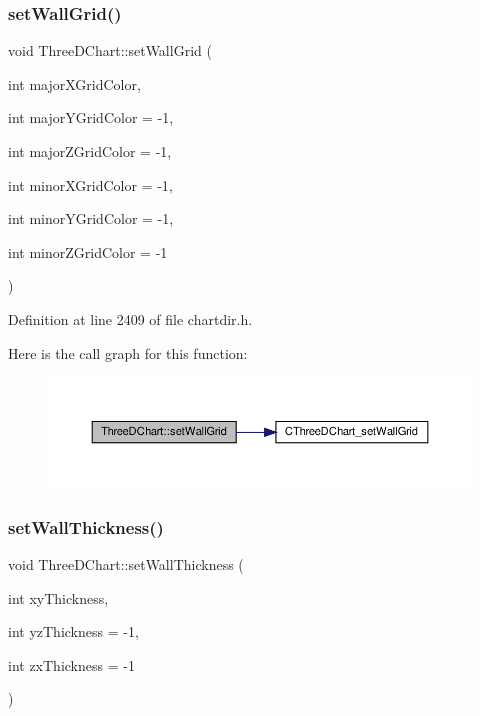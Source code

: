 \subsubsection{\texorpdfstring{set\+Wall\+Grid()}{setWallGrid()}}
{\footnotesize\ttfamily void Three\+D\+Chart\+::set\+Wall\+Grid (\begin{DoxyParamCaption}\item[{int}]{major\+X\+Grid\+Color,  }\item[{int}]{major\+Y\+Grid\+Color = {\ttfamily -\/1},  }\item[{int}]{major\+Z\+Grid\+Color = {\ttfamily -\/1},  }\item[{int}]{minor\+X\+Grid\+Color = {\ttfamily -\/1},  }\item[{int}]{minor\+Y\+Grid\+Color = {\ttfamily -\/1},  }\item[{int}]{minor\+Z\+Grid\+Color = {\ttfamily -\/1} }\end{DoxyParamCaption})\hspace{0.3cm}{\ttfamily [inline]}}



Definition at line 2409 of file chartdir.\+h.

Here is the call graph for this function\+:
\nopagebreak
\begin{figure}[H]
\begin{center}
\leavevmode
\includegraphics[width=350pt]{class_three_d_chart_a5a057339c27b9faa0d46f07666f5b0e7_cgraph}
\end{center}
\end{figure}
\mbox{\label{class_three_d_chart_a13b070b549798dae6ba2420cc1d398f8}} 
\subsubsection{\texorpdfstring{set\+Wall\+Thickness()}{setWallThickness()}}
{\footnotesize\ttfamily void Three\+D\+Chart\+::set\+Wall\+Thickness (\begin{DoxyParamCaption}\item[{int}]{xy\+Thickness,  }\item[{int}]{yz\+Thickness = {\ttfamily -\/1},  }\item[{int}]{zx\+Thickness = {\ttfamily -\/1} }\end{DoxyParamCaption})\hspace{0.3cm}{\ttfamily [inline]}}



